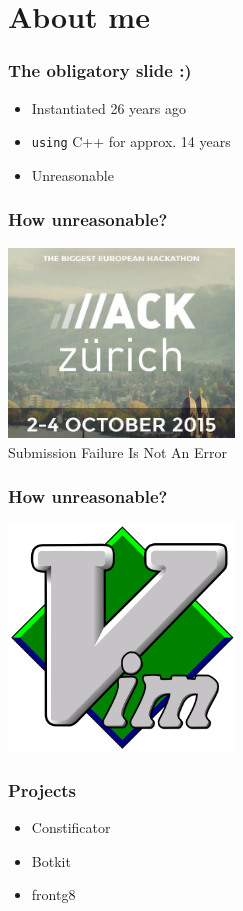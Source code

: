 \section{About me}
\begin{frame}
  \frametitle{The obligatory slide :)}
  \begin{itemize}
      \item Instantiated 26 years ago
      \item \texttt{using} C++ for approx. 14 years
      \item Unreasonable
  \end{itemize}
\end{frame}
\begin{frame}
  \frametitle{How unreasonable?}
  \begin{center}
    \includegraphics[width=6cm]{images/hackzh}
    \\Submission Failure Is Not An Error
  \end{center}
\end{frame}
\begin{frame}
  \frametitle{How unreasonable?}
  \begin{center}
    \includegraphics[width=6cm]{images/vim}
  \end{center}
\end{frame}
\begin{frame}
  \frametitle{Projects}
  \begin{itemize}
      \item Constificator
      \item Botkit
      \item frontg8
  \end{itemize}
\end{frame}
